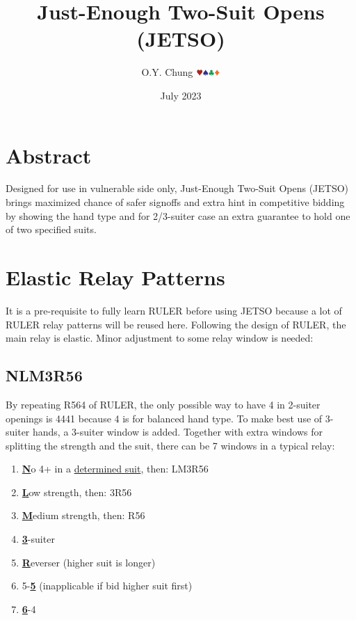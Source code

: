 \documentclass{article}
\title{Just-Enough Two-Suit Opens (JETSO)}
\author{O.Y. Chung $\hhh\sss\ccc\ddd$}
\date{July 2023}
\begin{document}
\begin{CJK*}{UTF8}{gbsn}
\end{CJK*}
\maketitle

\begin{multicols}{2}

\section{Abstract}
Designed for use in vulnerable side only, Just-Enough Two-Suit Opens (JETSO) brings maximized chance of safer signoffs and extra hint in competitive bidding by showing the hand type and for 2/3-suiter case an extra guarantee to hold one of two specified suits.

\section{Elastic Relay Patterns}
It is a pre-requisite to fully learn RULER before using JETSO because a lot of RULER relay patterns will be reused here.  Following the design of RULER, the main relay is elastic. Minor adjustment to some relay window is needed:
\subsection{NLM3R56}\label{sec:nlm3r56}
By repeating R564 of RULER, the only possible way to have 4 in 2-suiter openings is 4441 because 4 is for balanced hand type. To make best use of 3-suiter hands, a 3-suiter window is added. Together with extra windows for splitting the strength and the suit, there can be 7 windows in a typical relay:
\begin{enumerate}
    \item \textbf{\underline{N}}o 4+ in a \hyperref[sec:determine-n-suit]{determined suit}, then: LM3R56
    \item \textbf{\underline{L}}ow strength, then: 3R56
    \item \textbf{\underline{M}}edium strength, then: R56
    \item \textbf{\underline{3}}-suiter
    \item \textbf{\underline{R}}everser (higher suit is longer)
    \item 5-\textbf{\underline{5}} (inapplicable if bid higher suit first)
    \item \textbf{\underline{6}}-4
\end{enumerate}


\end{multicols}
\end{document}
